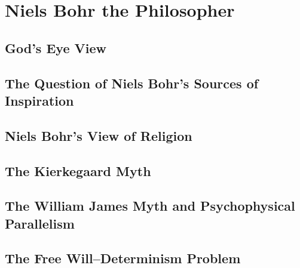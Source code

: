\documentclass[12pt,a4paper]{book}
\begin{document}
\part{Niels Bohr the Philosopher}
\label{part:philosopher}

\chapter{God's Eye View}
\label{chap:gods-eye-view}

\chapter{The Question of Niels Bohr's Sources of Inspiration}
\label{chap:inspiration}

\chapter{Niels Bohr's View of Religion}
\label{chap:religion}

\chapter{The Kierkegaard Myth}
\label{chap:kierkegaard-myth}

\chapter{The William James Myth and Psychophysical Parallelism}
\label{chap:james-myth}

\chapter{The Free Will--Determinism Problem}
\label{chap:free-will}
\end{document}
